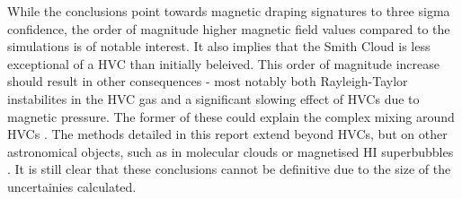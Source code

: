 While the conclusions point towards magnetic draping signatures to three sigma confidence, the order of magnitude higher magnetic field values compared to the \citeauthor{ID23} simulations is of notable interest. It also implies that the Smith Cloud is less exceptional of a HVC than initially beleived. This order of magnitude increase should result in other consequences - most notably both Rayleigh-Taylor instabilites in the HVC gas and a significant slowing effect of HVCs due to magnetic pressure. The former of these could explain the complex mixing around HVCs \citep{ID67}. The methods detailed in this report extend beyond HVCs, but on other astronomical objects, such as in molecular clouds or magnetised HI superbubbles \citep{ID70,ID75}. It is still clear that these conclusions cannot be definitive due to the size of the uncertainies calculated.
